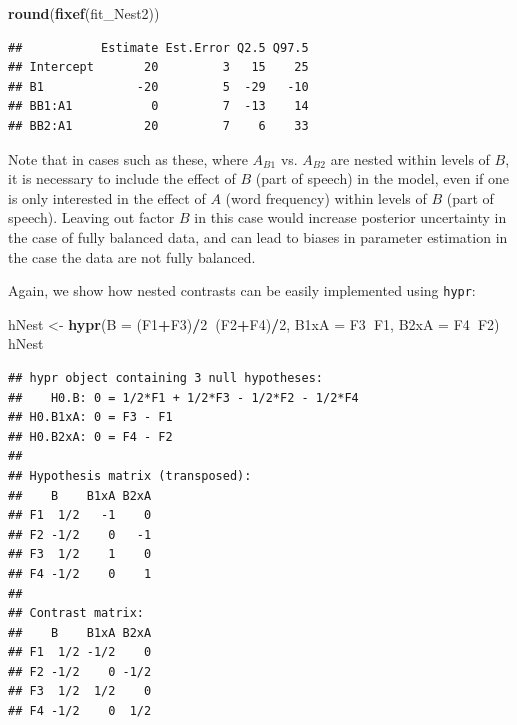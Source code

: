 \documentclass[12pt,]{krantz}
\newenvironment{Shaded}{\begin{snugshade}}{\end{snugshade}}
\newcommand{\DataTypeTok}[1]{\textcolor[rgb]{0.13,0.29,0.53}{#1}}
\newcommand{\DecValTok}[1]{\textcolor[rgb]{0.00,0.00,0.81}{#1}}
\newcommand{\KeywordTok}[1]{\textcolor[rgb]{0.13,0.29,0.53}{\textbf{#1}}}
\newcommand{\NormalTok}[1]{#1}
\newcommand{\OperatorTok}[1]{\textcolor[rgb]{0.81,0.36,0.00}{\textbf{#1}}}
\newcommand{\StringTok}[1]{\textcolor[rgb]{0.31,0.60,0.02}{#1}}
\theoremstyle{definition}
\theoremstyle{definition}
\theoremstyle{definition}
\theoremstyle{remark}
\begin{document}
\begin{Shaded}
\begin{Highlighting}[]
\KeywordTok{round}\NormalTok{(}\KeywordTok{fixef}\NormalTok{(fit_Nest2))}
\end{Highlighting}
\end{Shaded}

\begin{verbatim}
##           Estimate Est.Error Q2.5 Q97.5
## Intercept       20         3   15    25
## B1             -20         5  -29   -10
## BB1:A1           0         7  -13    14
## BB2:A1          20         7    6    33
\end{verbatim}

Note that in cases such as these, where \(A_{B1}\) vs. \(A_{B2}\) are nested within levels of \(B\), it is necessary to include the effect of \(B\) (part of speech) in the model, even if one is only interested in the effect of \(A\) (word frequency) within levels of \(B\) (part of speech). Leaving out factor \(B\) in this case would increase posterior uncertainty in the case of fully balanced data, and can lead to biases in parameter estimation in the case the data are not fully balanced.

Again, we show how nested contrasts can be easily implemented using \texttt{hypr}:

\begin{Shaded}
\begin{Highlighting}[]
\NormalTok{hNest <-}\StringTok{ }\KeywordTok{hypr}\NormalTok{(}\DataTypeTok{B    =}\NormalTok{ (F1}\OperatorTok{+}\NormalTok{F3)}\OperatorTok{/}\DecValTok{2}\OperatorTok{~}\NormalTok{(F2}\OperatorTok{+}\NormalTok{F4)}\OperatorTok{/}\DecValTok{2}\NormalTok{,}
              \DataTypeTok{B1xA =}\NormalTok{ F3}\OperatorTok{~}\NormalTok{F1,}
              \DataTypeTok{B2xA =}\NormalTok{ F4}\OperatorTok{~}\NormalTok{F2)}
\NormalTok{hNest}
\end{Highlighting}
\end{Shaded}

\begin{verbatim}
## hypr object containing 3 null hypotheses:
##    H0.B: 0 = 1/2*F1 + 1/2*F3 - 1/2*F2 - 1/2*F4
## H0.B1xA: 0 = F3 - F1
## H0.B2xA: 0 = F4 - F2
## 
## Hypothesis matrix (transposed):
##    B    B1xA B2xA
## F1  1/2   -1    0
## F2 -1/2    0   -1
## F3  1/2    1    0
## F4 -1/2    0    1
## 
## Contrast matrix:
##    B    B1xA B2xA
## F1  1/2 -1/2    0
## F2 -1/2    0 -1/2
## F3  1/2  1/2    0
## F4 -1/2    0  1/2
\end{verbatim}
\end{document}
